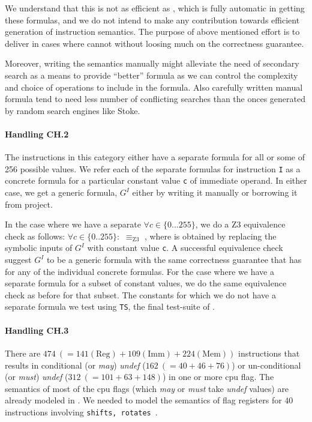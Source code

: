     We understand that this
   is not as efficient as \Stoke, which is fully automatic in getting these
   formulas, and we do not intend to make any contribution towards efficient 
   generation of instruction semantics. The purpose of above mentioned effort is to deliver in cases where \Stoke cannot without loosing 
   much on the correctness guarantee. 
   
   Moreover, writing the
   semantics manually might alleviate the need of secondary search as a means to
   provide ``better'' formula as we can control the complexity and choice of
   operations to include in the formula. Also carefully written manual formula
   tend to need less number of conflicting searches than the onces generated by
   random search engines like Stoke.
   
   
   
   \paragraph{Handling CH.2} The instructions in this category either  have a
   separate formula for all or some of 256 possible values. We refer each of the
   separate formulas for instruction {\tt I} as a concrete formula  for
   a particular constant value {\tt c} of immediate operand.  In either case, we
   get a generic formula, $G^I$ either by writing it manually or borrowing it
   from  \Stoke project.
   
   In the case where we have a separate  $\forall c \in \{0...255\}$,
   we do a Z3 equivalence check as follows: $\forall c \in \{0..255\}:$
    $\equiv_\text{Z3}$ , where  is obtained by
   replacing the symbolic inputs of $G^I$ with constant value {\tt c}. A
   successful equivalence check suggest $G^I$ to be a generic formula with the
   same correctness guarantee that \Strata has for any of the individual
   concrete formulas. For the case where we have a separate formula for a subset
   of constant values, we do the same equivalence check as before for that
   subset. The constants for which we do not have a separate formula we test
    using {\tt TS}, the final test-suite of \Strata. 
    
    \paragraph{Handling CH.3} There are $474\ (= 141(\text{Reg}) +
        109(\text{Imm}) + 224(\text{Mem}))$ instructions that results in
    conditional  (or \emph{may}) \emph{undef} ($162\ (= 40 + 46 + 76)$) or
    un-conditional (or \emph{must}) \emph{undef} ($312\ (= 101 + 63 + 148)$)  in
    one or more cpu flag.  The semantics of most of the cpu flags (which
        \emph{may} or \emph{must} take \emph{undef} values) are already modeled
    in \Stoke. We needed to model the semantics of flag registers for $40$
    instructions involving {\tt shifts, rotates}~\cite{BugStoke986}. 
    
